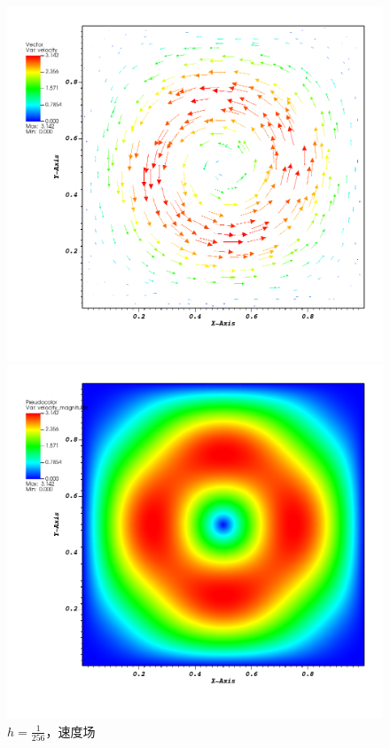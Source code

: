 \documentclass[lang=cn,11pt,a4paper]{elegantpaper}
\begin{document}
\begin{figure}[H]
    \centering
    \begin{minipage}[t]{0.32\textwidth}
        \centering
        \includegraphics[width=\linewidth]{fig/velocity.png}
        \caption{\small $h=\frac{1}{256}$，速度场}
    \end{minipage}
    \hfill
    \begin{minipage}[t]{0.32\textwidth}
        \centering
        \includegraphics[width=\linewidth]{fig/velocity_mag.png}

\end{minipage}
\end{figure}
\end{document}
